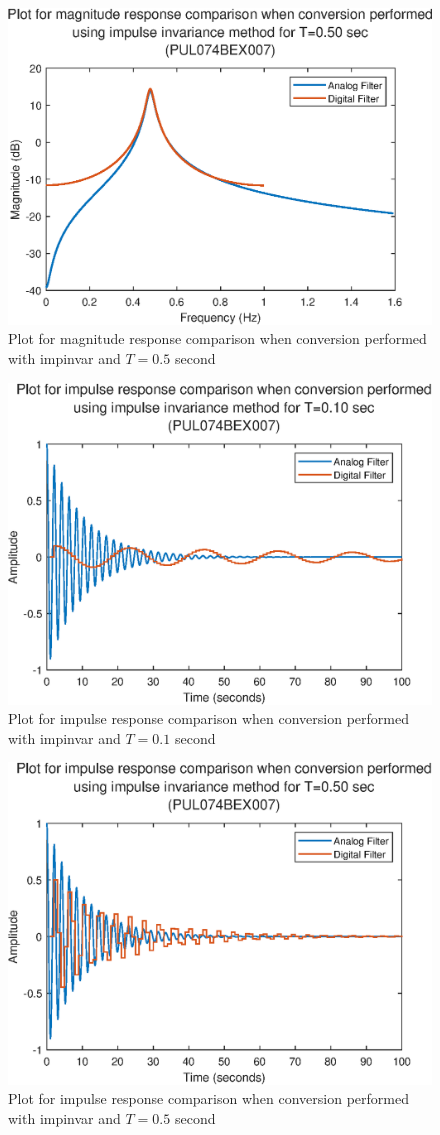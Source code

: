 \documentclass{lab_sheet}
\begin{document}
\begin{figure}[H]
    \centering
    \includegraphics[width=0.7\linewidth]{../Figures/mag_res_impulse invariance method_1.eps}
    \caption{Plot for magnitude response comparison when conversion performed with impinvar and $T=0.5$ second}
    \label{fig:5_1_b}
\end{figure}

\begin{figure}[H]
    \centering
    \includegraphics[width=0.7\linewidth]{../Figures/impulse_res_impulse invariance method_0.eps}
    \caption{Plot for impulse response comparison when conversion performed with impinvar and $T=0.1$ second}
    \label{fig:5_1_c}
\end{figure}

\begin{figure}[H]
    \centering
    \includegraphics[width=0.7\linewidth]{../Figures/impulse_res_impulse invariance method_1.eps}
    \caption{Plot for impulse response comparison when conversion performed with impinvar and $T=0.5$ second}
    \label{fig:5_1_d}
\end{figure}
\end{document}
